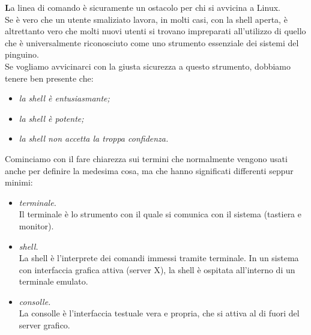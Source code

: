 \onehalfspacing
\lettrine[lines=1, loversize=0.1, lraise=0.1]{\color[cmyk]{0.5, 0, 1, 0}\bfseries L}{}a linea di comando è sicuramente un ostacolo per chi si avvicina a Linux.\\

Se è vero che un utente smaliziato lavora, in molti casi, con la shell aperta, è altrettanto vero che molti nuovi utenti si trovano impreparati all'utilizzo di quello che è universalmente riconosciuto come uno strumento essenziale dei sistemi del pinguino.\\

Se vogliamo avvicinarci con la giusta sicurezza a questo strumento, dobbiamo tenere ben presente che:
\begin{itemize}
 \item {\itshape la shell è entusiasmante;}
 \item {\itshape la shell è potente;}
 \item {\itshape la shell non accetta la troppa confidenza.} 
\end{itemize}

Cominciamo con il fare chiarezza sui termini che normalmente vengono usati anche per definire la medesima cosa, ma che hanno significati differenti seppur minimi:

\begin{itemize}
 \item {\itshape terminale.}\\
Il terminale è lo strumento con il quale si comunica con il sistema (tastiera e monitor).
 \item {\itshape shell.}\\
La shell è l'interprete dei comandi immessi tramite terminale. In un sistema con
interfaccia grafica attiva (server X), la shell è ospitata all’interno
di un terminale emulato. 
 \item {\itshape consolle.} \\
La consolle è l'interfaccia testuale vera e propria, che si attiva al di fuori del server grafico. 
\end{itemize}

